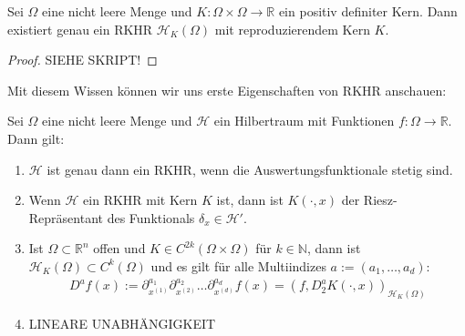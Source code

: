 \begin{theorem}
Sei $\Omega$ eine nicht leere Menge und $K:\Omega \times \Omega \rightarrow \mathbb{R}$ ein positiv definiter Kern. Dann existiert genau ein \ac{RKHR} $\mathcal{H}_K (\Omega)$ mit reproduzierendem Kern $K$.
\end{theorem}
\begin{proof}
SIEHE SKRIPT!
\end{proof}

Mit diesem Wissen können wir uns erste Eigenschaften von \ac{RKHR} anschauen:

\begin{theorem}
\label{stetig}
Sei $\Omega$ eine nicht leere Menge und $\mathcal{H}$ ein Hilbertraum mit Funktionen $f: \Omega \rightarrow \mathbb{R}$. Dann gilt:
\begin{enumerate}
\item $\mathcal{H}$ ist genau dann ein \ac{RKHR}, wenn die Auswertungsfunktionale stetig sind.
\item Wenn $\mathcal{H}$ ein \ac{RKHR} mit Kern $K$ ist, dann ist $K(\cdot,x)$ der Riesz-Repräsentant des Funktionals $\delta_x \in \mathcal{H}'$.
\item Ist $\Omega \subset \mathbb{R}^n$ offen und $K \in C^{2k}(\Omega \times \Omega)$ für $k \in \mathbb{N}$, dann ist $\mathcal{H}_K(\Omega) \subset C^k(\Omega)$ und es gilt für alle Multiindizes $a:= (a_1,\dots, a_d)$:
\begin{align*}
D^a f(x):= \partial_{x^{(1)}}^{a_1}\partial_{x^{(2)}}^{a_2} \dots \partial_{x^{(d)}}^{a_d} f(x) = (f, D_2^a K(\cdot,x))_{\mathcal{H}_K(\Omega)}
\end{align*}
\label{linUn}
\item LINEARE UNABHÄNGIGKEIT
\end{enumerate}
\end{theorem}


